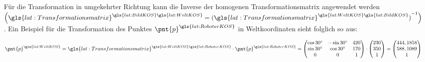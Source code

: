 Für die Transformation in umgekehrter Richtung kann die Inverse der homogenen Transformationsmatrix angewendet werden \( \left( \gls{lat:Transformationsmatrix}^{\gls{lat:BildKOS} \gls{lat:WeltKOS}} = {(\gls{lat:Transformationsmatrix}^{\gls{lat:WeltKOS} \gls{lat:BildKOS}})}^{-1} \right) \). Ein Beispiel für die Transformation des Punktes \( \pnt{p}^{\gls{lat:RoboterKOS}} \) in Weltkoordinaten sieht folglich so aus:

\begin{equation}
\pnt{p}^{\gls{lat:WeltKOS}} =
\gls{lat:Transformationsmatrix}^{\gls{lat:WeltKOS} \gls{lat:RoboterKOS}} \cdot 
\pnt{p}^{\gls{lat:RoboterKOS}} =
\begin{pmatrix}
\cos{30^\circ} 	& -\sin{30^\circ} 	& 420 	\\
\sin{30^\circ} 	& \cos{30^\circ} 	& 170 	\\
0 				& 0 				& 1 	\\
\end{pmatrix}
\cdot
\begin{pmatrix}
230 	\\
350 	\\
1   \\
\end{pmatrix}
=
\begin{pmatrix}
444,1858 	\\
588,1089 	\\
1    	\\
\end{pmatrix}
\end{equation}

